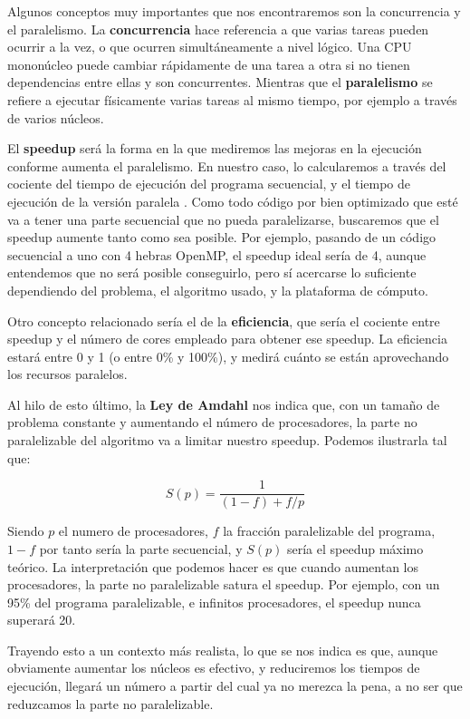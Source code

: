 Algunos conceptos muy importantes que nos encontraremos son la concurrencia y el paralelismo. La \textbf{concurrencia} hace referencia a que varias tareas pueden ocurrir a la vez, o que ocurren simultáneamente a nivel lógico. Una CPU mononúcleo puede cambiar rápidamente de una tarea a otra si no tienen dependencias entre ellas y son concurrentes. Mientras que el \textbf{paralelismo} se refiere a ejecutar físicamente varias tareas al mismo tiempo, por ejemplo a través de varios núcleos.

El \textbf{speedup} será la forma en la que mediremos las mejoras en la ejecución conforme aumenta el paralelismo. En nuestro caso, lo calcularemos a través del cociente del tiempo de ejecución del programa secuencial, y el tiempo de ejecución de la versión paralela \cite{Schryen2024}. Como todo código por bien optimizado que esté va a tener una parte secuencial que no pueda paralelizarse, buscaremos que el speedup aumente tanto como sea posible. Por ejemplo, pasando de un código secuencial a uno con 4 hebras OpenMP, el speedup ideal sería de 4, aunque entendemos que no será posible conseguirlo, pero sí acercarse lo suficiente dependiendo del problema, el algoritmo usado, y la plataforma de cómputo. 

Otro concepto relacionado sería el de la \textbf{eficiencia}, que sería el cociente entre speedup y el número de cores empleado para obtener ese speedup. La eficiencia estará entre 0 y 1 (o entre 0\% y 100\%), y medirá cuánto se están aprovechando los recursos paralelos.

Al hilo de esto último, la \textbf{Ley de Amdahl} \cite{Amdahl1967} nos indica que, con un tamaño de problema constante y aumentando el número de procesadores, la parte no paralelizable del algoritmo va a limitar nuestro speedup. Podemos ilustrarla tal que:

\begin{equation}
	\label{eq:LeyAmdahl}
	S(p) = \frac{1}{ (1-f) + f/p }
\end{equation}

Siendo $p$ el numero de procesadores, $f$ la fracción paralelizable del programa, $1-f$ por tanto sería la parte secuencial, y $S(p)$ sería el speedup máximo teórico. La interpretación que podemos hacer es que cuando aumentan los procesadores, la parte no paralelizable satura el speedup. Por ejemplo, con un 95\% del programa paralelizable, e infinitos procesadores, el speedup nunca superará 20. 

Trayendo esto a un contexto más realista, lo que se nos indica es que, aunque obviamente aumentar los núcleos es efectivo, y reduciremos los tiempos de ejecución, llegará un número a partir del cual ya no merezca la pena, a no ser que reduzcamos la parte no paralelizable.

